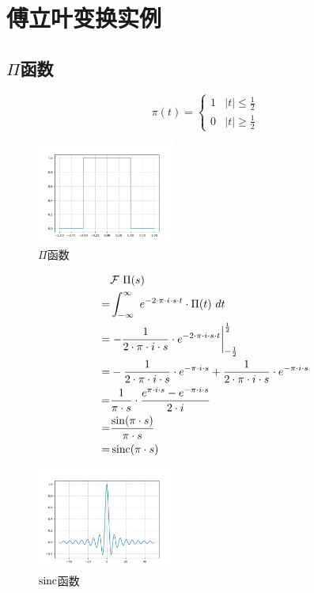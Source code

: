\section{傅立叶变换实例}
\subsection{$\Pi$函数}
$$
	\pi(t)=
	\begin{cases}
		1 & |t|\leq\frac{1}{2} \\
		0 & |t|\geq\frac{1}{2}
	\end{cases}
$$
\begin{figure}[H]
	\centering
	\includegraphics[width=0.4\textwidth]{assets/Figure_3.png}
	\caption{$\Pi$函数}
\end{figure}
\begin{align*}
	  & \mathcal{F}\ \Pi(s)                                                                                                            \\
	= & \int_{-\infty}^{\infty}\ e^{-2\cdot \pi\cdot i\cdot s\cdot t}\cdot \Pi(t)\ dt                                                  \\
	= & \rsx{-\frac{1}{2\cdot\pi\cdot i\cdot s}\cdot e^{-2\cdot \pi\cdot i\cdot s\cdot t}}_{-\frac{1}{2}}^{\frac{1}{2}}                \\
	= & -\frac{1}{2\cdot\pi\cdot i\cdot s}\cdot e^{- \pi\cdot i\cdot s}+\frac{1}{2\cdot\pi\cdot i\cdot s}\cdot e^{- \pi\cdot i\cdot s} \\
	= & \frac{1}{\pi\cdot s}\cdot \frac{e^{\pi\cdot i\cdot s}-e^{- \pi\cdot i\cdot s}}{2\cdot i}                                       \\
	= & \frac{\sin(\pi\cdot s)}{\pi\cdot s}                                                                                            \\
	= & \sinc(\pi\cdot s)
\end{align*}
\begin{figure}[H]
	\centering
	\includegraphics[width=0.4\textwidth]{assets/Figure_2.png}
	\caption{$\operatorname{sinc}$函数}
\end{figure}
